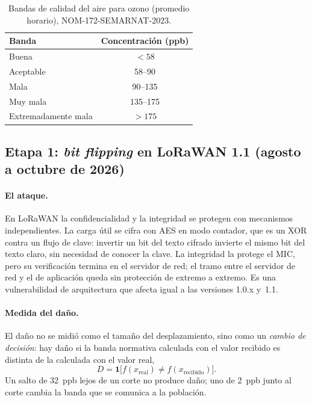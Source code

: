 \documentclass[11pt, letterpaper]{article}
\begin{document}
\begin{table}[H]
  \centering
  \small
  \caption{Bandas de calidad del aire para ozono (promedio horario), NOM-172-SEMARNAT-2023.}
  \label{tab:nom}
  \begin{tabular}{@{}lc@{}}
    \toprule
    \textbf{Banda} & \textbf{Concentración (ppb)} \\
    \midrule
    Buena & $<58$ \\
    Aceptable & 58--90 \\
    Mala & 90--135 \\
    Muy mala & 135--175 \\
    Extremadamente mala & $>175$ \\
    \bottomrule
  \end{tabular}
\end{table}

\subsection{Etapa 1: \emph{bit flipping} en LoRaWAN 1.1 (agosto a octubre de 2026)}
\label{sec:etapa1}

\paragraph{El ataque.} En LoRaWAN la confidencialidad y la integridad se protegen con
mecanismos independientes. La carga útil se cifra con AES en modo contador, que es un XOR
contra un flujo de clave: invertir un bit del texto cifrado invierte el mismo bit del texto
claro, sin necesidad de conocer la clave. La integridad la protege el MIC, pero su
verificación termina en el servidor de red; el tramo entre el servidor de red y el de
aplicación queda sin protección de extremo a extremo. Es una vulnerabilidad de
arquitectura que afecta igual a las versiones 1.0.x y~1.1.

\paragraph{Medida del daño.} El daño no se midió como el tamaño del desplazamiento, sino
como un \emph{cambio de decisión}: hay daño si la banda normativa calculada con el valor
recibido es distinta de la calculada con el valor real,
\[
  D = \mathbf{1}\bigl[f(x_{\text{real}}) \neq f(x_{\text{recibido}})\bigr].
\]
Un salto de 32~ppb lejos de un corte no produce daño; uno de 2~ppb junto al corte cambia
la banda que se comunica a la población.
\end{document}
